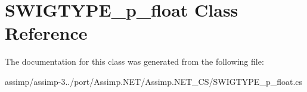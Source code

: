 \hypertarget{class_s_w_i_g_t_y_p_e__p__float}{\section{S\+W\+I\+G\+T\+Y\+P\+E\+\_\+p\+\_\+float Class Reference}
\label{class_s_w_i_g_t_y_p_e__p__float}
}


The documentation for this class was generated from the following file\+:\begin{DoxyCompactItemize}
\item 
assimp/assimp-\/3../port/\+Assimp.\+N\+E\+T/\+Assimp.\+N\+E\+T\+\_\+\+C\+S/S\+W\+I\+G\+T\+Y\+P\+E\+\_\+p\+\_\+float.\+cs\end{DoxyCompactItemize}
